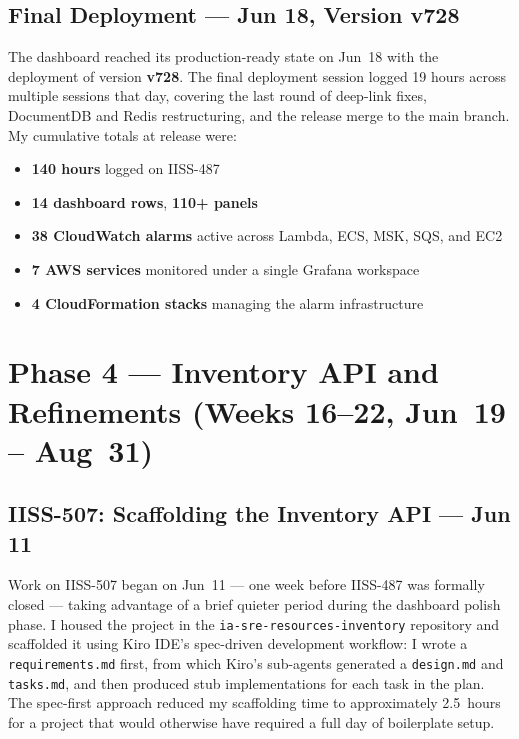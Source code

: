 \subsection{Final Deployment --- Jun 18, Version v728}

The dashboard reached its production-ready state on Jun~18 with the deployment
of version \textbf{v728}. The final deployment session logged 19 hours across
multiple sessions that day, covering the last round of deep-link fixes,
DocumentDB and Redis restructuring, and the release merge to the main branch.
My cumulative totals at release were:

\begin{itemize}
    \item \textbf{140 hours} logged on IISS-487
    \item \textbf{14 dashboard rows}, \textbf{110+ panels}
    \item \textbf{38 CloudWatch alarms} active across Lambda, ECS, MSK, SQS, and EC2
    \item \textbf{7 AWS services} monitored under a single Grafana workspace
    \item \textbf{4 CloudFormation stacks} managing the alarm infrastructure
\end{itemize}

\section{Phase 4 --- Inventory API and Refinements (Weeks 16--22, Jun~19 -- Aug~31)}
\label{sec:phase4_inventory}

\subsection{IISS-507: Scaffolding the Inventory API --- Jun 11}

Work on IISS-507 began on Jun~11 --- one week before IISS-487 was formally
closed --- taking advantage of a brief quieter period during the dashboard
polish phase. I housed the project in the \texttt{ia-sre-resources-inventory}
repository and scaffolded it using Kiro IDE's spec-driven development workflow:
I wrote a \texttt{requirements.md} first, from which Kiro's sub-agents
generated a \texttt{design.md} and \texttt{tasks.md}, and then produced stub
implementations for each task in the plan. The spec-first approach reduced my
scaffolding time to approximately 2.5~hours for a project that would otherwise
have required a full day of boilerplate setup.

